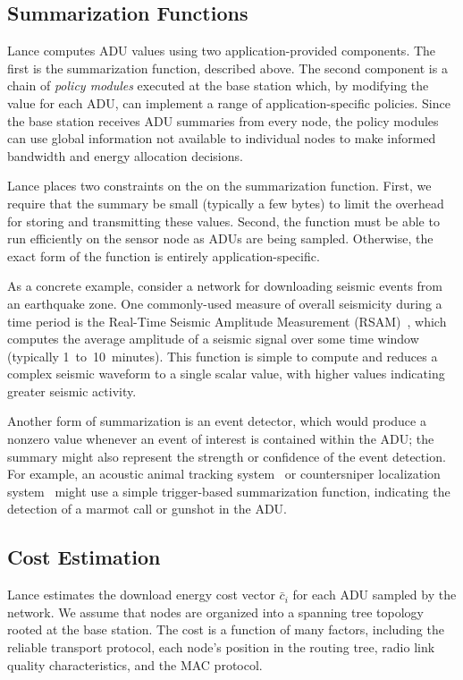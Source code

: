 \subsection{Summarization Functions}

Lance computes ADU values using two application-provided components. The
first is the summarization function, described above. The second component is
a chain of \textit{policy modules} executed at the base station which, by
modifying the value for each ADU, can implement a range of
application-specific policies. Since the base station receives ADU summaries
from every node, the policy modules can use global information not available
to individual nodes to make informed bandwidth and energy allocation
decisions.

Lance places two constraints on the on the summarization function. First, we
require that the summary be small (typically a few bytes) to limit the
overhead for storing and transmitting these values. Second, the function must
be able to run efficiently on the sensor node as ADUs are being sampled.
Otherwise, the exact form of the function is entirely application-specific.

As a concrete example, consider a network for downloading seismic events from
an earthquake zone. One commonly-used measure of overall seismicity during a
time period is the Real-Time Seismic Amplitude Measurement
(RSAM)~\cite{rsam}, which computes the average amplitude of a seismic signal
over some time window (typically 1~to~10~minutes). This function is simple
to compute and reduces a complex seismic waveform to a single scalar value,
with higher values indicating greater seismic activity.

Another form of summarization is an event detector, which would produce a
nonzero value whenever an event of interest is contained within the ADU; the
summary might also represent the strength or confidence of the event
detection. For example, an acoustic animal tracking
system~\cite{girod-ipsn07} or countersniper localization
system~\cite{shooter-localization} might use a simple trigger-based
summarization function, indicating the detection of a marmot call or gunshot
in the ADU.

\subsection{Cost Estimation}
\label{lance-sec-costassignment}

Lance estimates the download energy cost vector $\bar{c}_i$ for each ADU
sampled by the network. We assume that nodes are organized into a spanning
tree topology rooted at the base station. The cost is a function of many
factors, including the reliable transport protocol, each node's position in
the routing tree, radio link quality characteristics, and the MAC protocol. 


